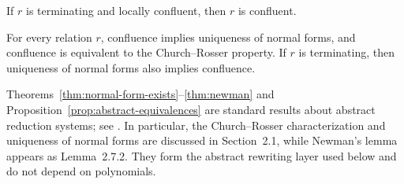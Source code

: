 \begin{theorem}\label{thm:newman}
If $r$ is terminating and locally confluent, then $r$ is confluent.
\end{theorem}

\begin{proposition}
\label{prop:abstract-equivalences}
For every relation $r$, confluence implies uniqueness of normal forms, and
confluence is equivalent to the Church--Rosser property.  If $r$ is
terminating, then uniqueness of normal forms also implies confluence.
\end{proposition}

Theorems~\ref{thm:normal-form-exists}--\ref{thm:newman} and
Proposition~\ref{prop:abstract-equivalences} are standard results about
abstract reduction systems; see \citet[Chapter~2]{BaaderNipkow1998}.
In particular, the Church--Rosser characterization and uniqueness of normal
forms are discussed in Section~2.1, while Newman's lemma appears as
Lemma~2.7.2. They form the abstract rewriting layer used below and do not
depend on polynomials.
